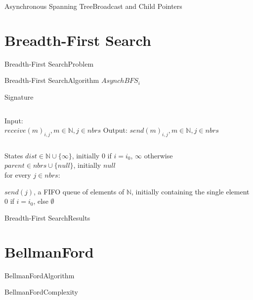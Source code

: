\documentclass[pdf]{beamer}
\begin{document}
\begin{frame}{Asynchronous Spanning Tree}{Broadcast and Child Pointers}
	
	
\end{frame}

\section{Breadth-First Search}
\begin{frame}{Breadth-First Search}{Problem}
	
	
\end{frame}

\begin{frame}{Breadth-First Search}{Algorithm}
	$AsynchBFS_i$
    \begin{block}{Signature}
        \begin{columns}
            Input:\\
            \hspace*{\parindent} $receive(m)_{i,j}, m \in \mathbb{N}, j \in nbrs$
            Output:
            \hspace*{\parindent} $send(m)_{i,j}, m \in \mathbb{N}, j \in nbrs$
        \end{columns}
    \end{block}
    \begin{block}{States}
        $dist \in \mathbb{N} \cup \{\infty\}$, initially $0$ if $i=i_0$, $\infty $ otherwise\\
        $parent \in nbrs \cup \{null\}$, initially $null$\\
        for every $j \in nbrs$:\\
        \hspace*{\parindent}
        \parbox{\textwidth}{$send(j)$,
        a FIFO queue of elements of $\mathbb{N}$,
        initially containing the single element $0$ if $i=i_0$, else $\emptyset$}
    \end{block}
	
\end{frame}

\begin{frame}{Breadth-First Search}{Results}
	
	
\end{frame}

\section{BellmanFord}
\begin{frame}{BellmanFord}{Algorithm}
	
	
\end{frame}
\begin{frame}{BellmanFord}{Complexity}
	
	
\end{frame}
\end{document}
